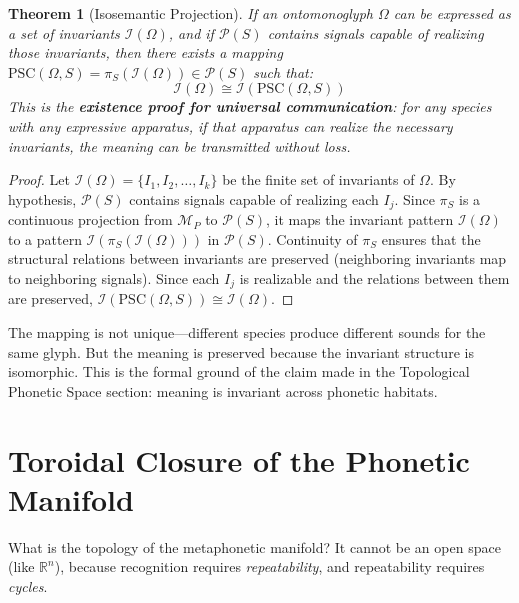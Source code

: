\documentclass[12pt, letterpaper]{book}
\newtheorem{theorem}{Theorem}[chapter]
\begin{document}
\begin{theorem}[Isosemantic Projection]\label{thm:isosemantic}
If an ontomonoglyph $\Omega$ can be expressed as a set of invariants $\mathcal{I}(\Omega)$, and if $\mathcal{P}(S)$ contains signals capable of realizing those invariants, then there exists a mapping $\mathrm{PSC}(\Omega, S) = \pi_S(\mathcal{I}(\Omega)) \in \mathcal{P}(S)$ such that:
\[
\mathcal{I}(\Omega) \cong \mathcal{I}(\mathrm{PSC}(\Omega, S))
\]
This is the \textbf{existence proof for universal communication}: for any species with any expressive apparatus, if that apparatus can realize the necessary invariants, the meaning can be transmitted without loss.
\end{theorem}

\begin{proof}
Let $\mathcal{I}(\Omega) = \{I_1, I_2, \ldots, I_k\}$ be the finite set of invariants of $\Omega$. By hypothesis, $\mathcal{P}(S)$ contains signals capable of realizing each $I_j$. Since $\pi_S$ is a continuous projection from $\mathcal{M}_P$ to $\mathcal{P}(S)$, it maps the invariant pattern $\mathcal{I}(\Omega)$ to a pattern $\mathcal{I}(\pi_S(\mathcal{I}(\Omega)))$ in $\mathcal{P}(S)$. Continuity of $\pi_S$ ensures that the structural relations between invariants are preserved (neighboring invariants map to neighboring signals). Since each $I_j$ is realizable and the relations between them are preserved, $\mathcal{I}(\mathrm{PSC}(\Omega, S)) \cong \mathcal{I}(\Omega)$.
\end{proof}

The mapping is not unique---different species produce different sounds for the same glyph. But the meaning is preserved because the invariant structure is isomorphic. This is the formal ground of the claim made in the Topological Phonetic Space section: meaning is invariant across phonetic habitats.


\section{Toroidal Closure of the Phonetic Manifold}

What is the topology of the metaphonetic manifold? It cannot be an open space (like $\mathbb{R}^n$), because recognition requires \textit{repeatability}, and repeatability requires \textit{cycles}.
\end{document}
